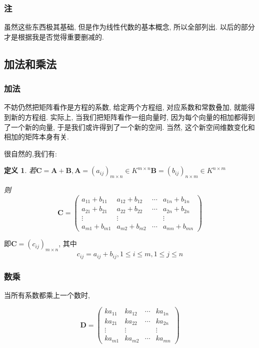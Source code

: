 \documentclass{article}
\newtheorem{mydef}{定义}
\begin{document}
\subsubsection{注}虽然这些东西极其基础, 但是作为线性代数的基本概念, 所以全部列出. 以后的部分才是根据我是否觉得重要删减的.

\subsection{加法和乘法}

\subsubsection{加法}
不妨仍然把矩阵看作是方程的系数, 给定两个方程组, 对应系数和常数叠加, 就能得到新的方程组. 实际上, 当我们把矩阵看作一组向量时, 因为每个向量的相加都得到了一个新的向量, 于是我们或许得到了一个新的空间. 当然, 这个新空间维数变化和相加的矩阵本身有关.

很自然的,我们有:
\begin{mydef}

\centerline{若$\boldsymbol{C}=\boldsymbol{A}+\boldsymbol{B},\boldsymbol{A}=\left(a_{i j}\right)_{m \times n} \in K^{m \times n}\boldsymbol{B}=\left(b_{i j}\right)_{n \times m} \in K^{n \times m}$}

则
$$
\boldsymbol{C}=\left(\begin{array}{cccc}
	a_{11}+b_{11} & a_{12}+b_{12} & \cdots & a_{1 n}+b_{1 n} \\
	a_{21}+b_{21} & a_{22}+b_{22} & \cdots & a_{2 n}+b_{2 n} \\
	\vdots & \vdots & & \vdots \\
	a_{m 1}+b_{m 1} & a_{m 2}+b_{m 2} & \cdots & a_{m n}+b_{m n}
\end{array}\right)
$$
\end{mydef}
即$\boldsymbol{C}=\left(c_{i j}\right)_{m \times n}$, 其中
$$
c_{i j}=a_{i j}+b_{i j}, 1 \leq i \leq m, 1 \leq j \leq n
$$

\subsubsection{数乘}
当所有系数都乘上一个数时,

$$
\boldsymbol{D}=\left(\begin{array}{cccc}
	k a_{11} & k a_{12} & \cdots & k a_{1 n} \\
	k a_{21} & k a_{22} & \cdots & k a_{2 n} \\
	\vdots & \vdots & & \vdots \\
	k a_{m 1} & k a_{m 2} & \cdots & k a_{m n}
\end{array}\right)
$$
\end{document}
